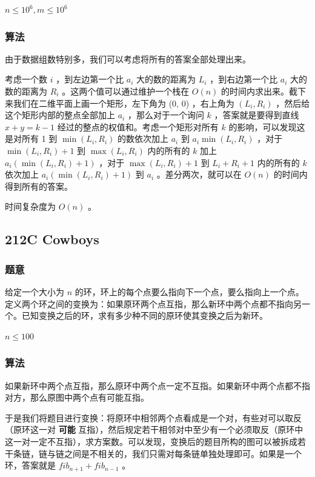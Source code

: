 \documentclass[11pt]{article}
\begin{document}
$n \leq 10^6, m \leq 10^6$
\subsubsection{算法}
\label{sec-12-5-2}

由于数据组数特别多，我们可以考虑将所有的答案全部处理出来。

考虑一个数 $i$ ，到左边第一个比 $a_i$ 大的数的距离为 $L_i$ ，到右边第一个比 $a_i$ 大的数的距离为 $R_i$ 。这两个值可以通过维护一个栈在 $O(n)$ 的时间内求出来。截下来我们在二维平面上画一个矩形，左下角为 (0, 0) ，右上角为 $(L_i, R_i)$ ，然后给这个矩形内部的整点全部加上 $a_i$ ，那么对于一个询问 $k$ ，答案就是要得到直线 $x + y = k - 1$ 经过的整点的权值和。考虑一个矩形对所有 $k$ 的影响，可以发现这是对所有 1 到 $\min(L_i, R_i)$ 的数依次加上 $a_i$ 到 $a_i \min(L_i, R_i)$ ，对于 $\min(L_i, R_i) + 1$ 到 $\max(L_i, R_i)$ 内的所有的 $k$ 加上 $a_i (\min(L_i, R_i) + 1)$ ，对于 $\max(L_i, R_i) + 1$ 到 $L_i + R_i + 1$ 内的所有的 $k$ 依次加上 $a_i (\min(L_i, R_i) + 1)$ 到 $a_i$ 。差分两次，就可以在 $O(n)$ 的时间内得到所有的答案。

时间复杂度为 $O(n)$ 。
\subsection{212C  Cowboys}
\label{sec-12-6}
\subsubsection{题意}
\label{sec-12-6-1}

给定一个大小为 $n$ 的环，环上的每个点要么指向下一个点，要么指向上一个点。定义两个环之间的变换为：如果原环两个点互指，那么新环中两个点都不指向另一个。已知变换之后的环，求有多少种不同的原环使其变换之后为新环。

$n \leq 100$
\subsubsection{算法}
\label{sec-12-6-2}

如果新环中两个点互指，那么原环中两个点一定不互指。如果新环中两个点都不指对方，那么原图中两个点有可能互指。

于是我们将题目进行变换：将原环中相邻两个点看成是一个对，有些对可以取反（原环这一对 \textbf{可能} 互指），然后规定若干相邻对中至少有一个必须取反（原环中这一对一定不互指），求方案数。可以发现，变换后的题目所构的图可以被拆成若干条链，链与链之间是不相关的，我们只需对每条链单独处理即可。如果是一个环，答案就是 $fib_{n + 1} + fib_{n - 1}$ 。
\end{document}
